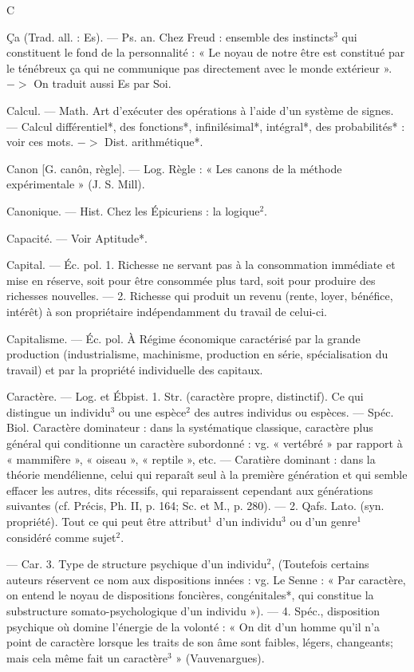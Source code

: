 
C

Ça (Trad. all. : Es). — Ps. an. Chez
Freud : ensemble des instincts$^3$ qui
constituent le fond de la personnalité :
« Le noyau de notre être est constitué
par le ténébreux ça qui ne communique pas directement avec le
monde extérieur ». $->$ On traduit
aussi Es par Soi.

Calcul. — Math. Art d'exécuter des
opérations à l’aide d’un système de
signes. — Calcul différentiel*, des
fonctions*, infinilésimal*, intégral*,
des probabilités* : voir ces mots.
$->$ Dist. arithmétique*.

Canon [G. canôn, règle]. — Log.
Règle : « Les canons de la méthode
expérimentale » (J. S. Mill).

Canonique. — Hist. Chez les Épicuriens : la logique$^2$.

Capacité. — Voir Aptitude*.

Capital. — Éc. pol. 1. Richesse ne
servant pas à la consommation
immédiate et mise en réserve, soit
pour être consommée plus tard, soit
pour produire des richesses nouvelles. — 2. Richesse qui produit un
revenu (rente, loyer, bénéfice, intérêt) à son propriétaire indépendamment du travail de celui-ci.

Capitalisme. — Éc. pol. À Régime économique caractérisé par la grande
production (industrialisme, machinisme, production en série, spécialisation
du travail) et par la propriété individuelle des capitaux.

Caractère. — Log. et Ébpist. 1. Str.
(caractère propre, distinctif). Ce qui
distingue un individu$^3$ ou une espèce$^2$
des autres individus ou espèces. —
Spéc. Biol. Caractère dominateur :
dans la systématique classique,
caractère plus général qui conditionne un caractère subordonné : vg.
« vertébré » par rapport à « mammifère », « oiseau », « reptile », etc. —
Caratière dominant : dans la théorie
mendélienne, celui qui reparaît seul
à la première génération et qui
semble effacer les autres, dits récessifs, qui reparaissent cependant aux
générations suivantes (cf. Précis,
Ph. II, p. 164; Sc. et M., p. 280). —
2. Qafs. Lato. (syn. propriété). Tout
ce qui peut être attribut$^1$ d’un individu$^3$ ou d’un genre$^1$ considéré
comme sujet$^2$.

— Car. 3. Type de structure psychique d’un individu$^2$, (Toutefois
certains auteurs réservent ce nom
aux dispositions innées : vg. Le
Senne : « Par caractère, on entend
le noyau de dispositions foncières,
congénitales*, qui constitue la substructure somato-psychologique d’un
individu »). — 4. Spéc., disposition
psychique où domine l'énergie de
la volonté : « On dit d’un homme
qu’il n’a point de caractère lorsque
les traits de son âme sont faibles,
légers, changeants; mais cela même
fait un caractère$^3$ » (Vauvenargues).

